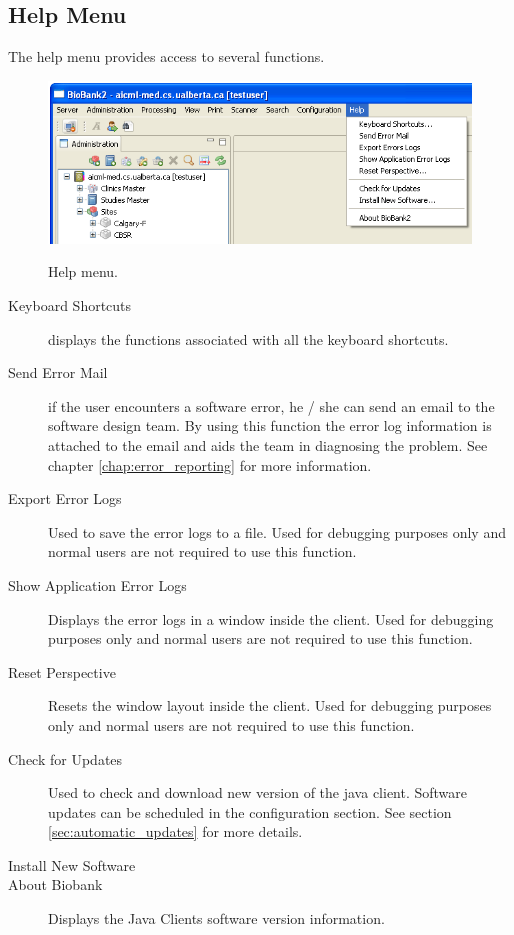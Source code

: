 \subsection{Help Menu}
The help menu provides access to several functions.
\begin{figure}[H]
  \centering
  \scalebox{0.5}
	   { \includegraphics*{screenshots/overview/main_menu_help} }
	   \caption{Help menu.}
	   \label{fig:main_menu_help}
\end{figure}
\begin{description}
\item[Keyboard Shortcuts] displays the functions associated with all the
  keyboard shortcuts.
\item[Send Error Mail] if the user encounters a software error, he / she can
  send an email to the software design team. By using this function the error
  log information is attached to the email and aids the team in diagnosing the
  problem. See chapter \ref{chap:error_reporting} for more information.
\item[Export Error Logs] Used to save the error logs to a file. Used for
  debugging purposes only and normal users are not required to use this
  function.
\item[Show Application Error Logs] Displays the error logs in a window inside
  the client. Used for debugging purposes only and normal users are not
  required to use this function.
\item[Reset Perspective] Resets the window layout inside the client. Used for
  debugging purposes only and normal users are not required to use this
  function.
\item[Check for Updates] Used to check and download new version of the java
client. Software updates can be scheduled in the configuration section. See
section \ref{sec:automatic_updates} for more details.
\item[Install New Software] %
\item[About Biobank] Displays the Java Clients software version information.
\end{description}

